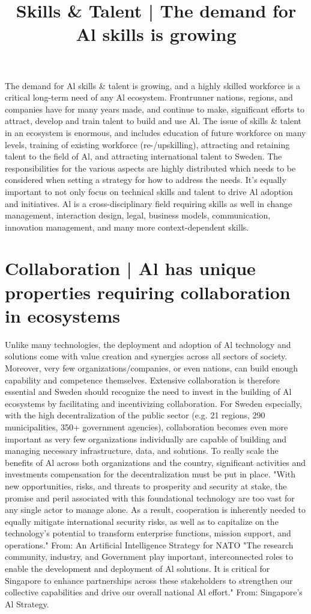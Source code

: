 \title{
Skills \& Talent | The demand for Al skills is growing
}
The demand for Al skills \& talent is growing, and a highly skilled workforce is a critical long-term need of any Al ecosystem. Frontrunner nations, regions, and companies have for many years made, and continue to make, significant efforts to attract, develop and train talent to build and use Al.
The issue of skills \& talent in an ecosystem is enormous, and includes education of future workforce on many levels, training of existing workforce (re-/upskilling), attracting and retaining talent to the field of Al, and attracting international talent to Sweden. The responsibilities for the various aspects are highly distributed which needs to be considered when setting a strategy for how to address the needs.
It's equally important to not only focus on technical skills and talent to drive Al adoption and initiatives. Al is a cross-disciplinary field requiring skills as well in change management, interaction design, legal, business models, communication, innovation management, and many more context-dependent skills.
\section*{Collaboration | Al has unique properties requiring collaboration in ecosystems}
Unlike many technologies, the deployment and adoption of Al technology and solutions come with value creation and synergies across all sectors of society. Moreover, very few organizations/companies, or even nations, can build enough capability and competence themselves. Extensive collaboration is therefore essential and Sweden should recognize the need to invest in the building of Al ecosystems by facilitating and incentivizing collaboration.
For Sweden especially, with the high decentralization of the public sector (e.g. 21 regions, 290 municipalities, 350+ government agencies), collaboration becomes even more important as very few organizations individually are capable of building and managing necessary infrastructure, data, and solutions. To really scale the benefits of Al across both organizations and the country, significant activities and investments compensation for the decentralization must be put in place.
"With new opportunities, risks, and threats to prosperity and security at stake, the promise and peril associated with this foundational technology are too vast for any single actor to manage alone. As a result, cooperation is inherently needed to equally mitigate international security risks, as well as to capitalize on the technology's potential to transform enterprise functions, mission support, and operations."
From: An Artificial Intelligence Strategy for NATO
"The research community, industry, and Government play important, interconnected roles to enable the development and deployment of Al solutions. It is critical for Singapore to enhance partnerships across these stakeholders to strengthen our collective capabilities and drive our overall national Al effort." From: Singapore's Al Strategy.

